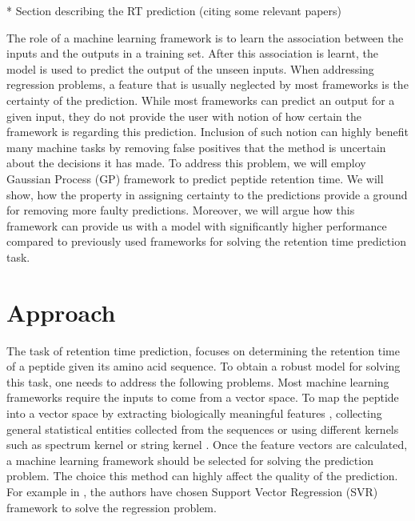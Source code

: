 \documentclass{bioinfo}
\begin{document}
* Section describing the RT prediction (citing some relevant papers)

The role of a machine learning framework is to learn the association between the inputs and the outputs in a training set. After this association is learnt, the model is used to predict the output of the unseen inputs. When addressing regression problems, a feature that is usually neglected by most frameworks is the certainty of the prediction. While most frameworks can predict an output for a given input, they do not provide the user with notion of how certain the framework is regarding this prediction. Inclusion of such notion can highly benefit many machine tasks by removing false positives that the method is uncertain about the decisions it has made. To address this problem, we will employ Gaussian Process (GP) framework \cite{Rasmussen:2006vza} to predict peptide retention time. We will show, how the property in assigning certainty to the predictions provide a ground for removing more faulty predictions. 
Moreover, we will argue how this framework can provide us with a model with significantly higher performance compared to previously used frameworks for solving the retention time prediction task.

\section{Approach}
The task of retention time prediction, focuses on determining the retention time of a peptide given its amino acid sequence. To obtain a robust model for solving this task, one needs to address the following problems. Most machine learning frameworks require the inputs to come from a vector space. To map the peptide into a vector space by extracting biologically meaningful features \cite{elute}, collecting general statistical entities collected from the sequences \cite{Rieck:2011ed} or using different kernels such as spectrum kernel \cite{Leslie:2002tx} or string kernel \cite{Lodhi:2002ts}. Once the feature vectors are calculated, a machine learning framework should be selected for solving the prediction problem. The choice this method can highly affect the quality of the prediction. For example in \cite{elute}, the authors have chosen Support Vector Regression (SVR) framework \cite{Bishop:2006ui} to solve the regression problem.
\end{document}
